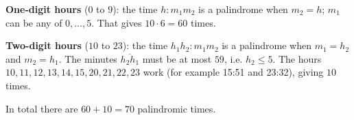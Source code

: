 \textbf{One-digit hours} ($0$ to $9$): the time $h{:}m_1m_2$ is a palindrome when $m_2=h$; $m_1$ can be any of $0,\dots,5$. That gives $10\cdot6=60$ times.

\textbf{Two-digit hours} ($10$ to $23$): the time $h_1h_2{:}m_1m_2$ is a palindrome when $m_1=h_2$ and $m_2=h_1$. The minutes $\overline{h_2h_1}$ must be at most $59$, i.e. $h_2\le5$. The hours $10,11,12,13,14,15,20,21,22,23$ work (for example 15:51 and 23:32), giving $10$ times.

In total there are $60+10=\boxed{70}$ palindromic times.
